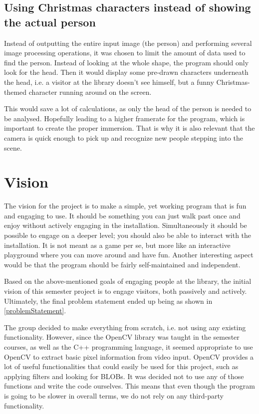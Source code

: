 
\subsection{Using Christmas characters instead of showing the actual person}
Instead of outputting the entire input image (the person) and performing several image processing operations, it was chosen to limit the amount of data used to find the person. Instead of looking at the whole shape, the program should only look for the head. Then it would display some pre-drawn characters underneath the head, i.e. a visitor at the library doesn't see himself, but a funny Christmas-themed character running around on the screen.

This would save a lot of calculations, as only the head of the person is needed to be analysed. Hopefully leading to a higher framerate for the program, which is important to create the proper immersion. That is why it is also relevant that the camera is quick enough to pick up and recognize new people stepping into the scene.
  
\section{Vision}
The vision for the project is to make a simple, yet working program that is fun and engaging to use. It should be something you can just walk past once and enjoy without actively engaging in the installation. Simultaneously it should be possible to engage on a deeper level; you should also be able to interact with the installation. It is not meant as a game per se, but more like an interactive playground where you can move around and have fun. Another interesting aspect would be that the program should be fairly self-maintained and independent.

Based on the above-mentioned goals of engaging people at the library, the initial vision of this semester project is to engage visitors, both passively and actively. Ultimately, the final problem statement ended up being as shown in \ref{problemStatement}.

The group decided to make everything from scratch, i.e. not using any existing functionality. However, since the OpenCV library was taught in the semester courses, as well as the C++ programming language, it seemed appropriate to use OpenCV to extract basic pixel information from video input. OpenCV provides a lot of useful functionalities that could easily be used for this project, such as applying filters and looking for BLOBs. It was decided not to use any of those functions and write the code ourselves. This means that even though the program is going to be slower in overall terms, we do not rely on any third-party functionality.

